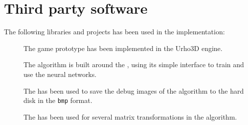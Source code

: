 \chapter{Third party software}
The following libraries and projects has been used in the implementation:
\begin{description}
	\item[\citet{urho}] The game prototype has been implemented in the Urho3D engine. 
	\item[\citet{fann}] The algorithm is built around the \citet{fann}, using its simple interface to train and use the neural networks.
	\item[\citet{bmp}] The \citet{bmp} has been used to save the debug images of the algorithm to the hard disk in the \texttt{bmp} format.
	\item[\citet{linalg}] The \citet{linalg} has been used for several matrix transformations in the algorithm.
\end{description}
